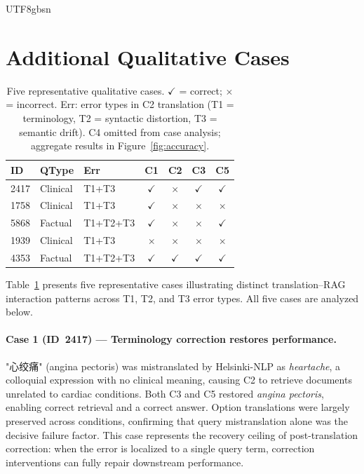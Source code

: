 \documentclass[11pt]{article}
\begin{document}
\begin{CJK}{UTF8}{gbsn}
\appendix
\section{Additional Qualitative Cases}
\label{sec:appendix_cases}

\begin{table}[H]
\centering
\small
\begin{tabular}{lllcccc}
\toprule
ID & QType & Err & C1 & C2 & C3 & C5 \\
\midrule
2417 & Clinical & T1+T3    & $\checkmark$ & $\times$     & $\checkmark$ & $\checkmark$ \\
1758 & Clinical & T1+T3    & $\checkmark$ & $\times$     & $\times$     & $\times$     \\
5868 & Factual  & T1+T2+T3 & $\checkmark$ & $\times$     & $\times$     & $\checkmark$ \\
1939 & Clinical & T1+T3    & $\times$     & $\times$     & $\times$     & $\times$     \\
4353 & Factual  & T1+T2+T3 & $\checkmark$ & $\checkmark$ & $\checkmark$ & $\checkmark$ \\
\bottomrule
\end{tabular}
\caption{Five representative qualitative cases. $\checkmark$ = correct; $\times$ = incorrect. Err: error types in C2 translation (T1 = terminology, T2 = syntactic distortion, T3 = semantic drift). C4 omitted from case analysis; aggregate results in Figure~\ref{fig:accuracy}.}
\label{tab:cases}
\end{table}
Table~\ref{tab:cases} presents five representative cases illustrating distinct translation--RAG interaction patterns across T1, T2, and T3 error types. All five cases are analyzed below.

  
\paragraph{Case 1 (ID~2417) --- Terminology correction restores performance.}
"心绞痛" (angina pectoris) was mistranslated by Helsinki-NLP as \textit{heartache}, a colloquial expression with no clinical meaning, causing C2 to retrieve documents unrelated to cardiac conditions. Both C3 and C5 restored \textit{angina pectoris}, enabling correct retrieval and a correct answer. Option translations were largely preserved across conditions, confirming that query mistranslation alone was the decisive failure factor. This case represents the recovery ceiling of post-translation correction: when the error is localized to a single query term, correction interventions can fully repair downstream performance.


\end{CJK}
\end{document}
